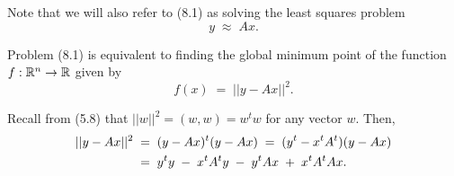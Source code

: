 Note that we will also refer to (8.1) as solving the least squares problem
\begin{equation}
y \;\approx\; Ax.
\end{equation}

Problem (8.1) is equivalent to finding the global minimum point of the function
$f : \mathbb{R}^n \to \mathbb{R}$ given by
\begin{equation}
f(x) \;=\; ||y - Ax||^2.
\end{equation}

Recall from (5.8) that $||w||^2 = (w,w) = w^tw$ for any vector $w$. Then,
\begin{align}
||y-Ax||^2 \;&=\; (y-Ax)^t(y-Ax) \;=\; (y^t - x^tA^t)(y-Ax) \notag\\
&=\; y^ty \;-\; x^tA^ty \;-\; y^tAx \;+\; x^tA^tAx.
\end{align}
